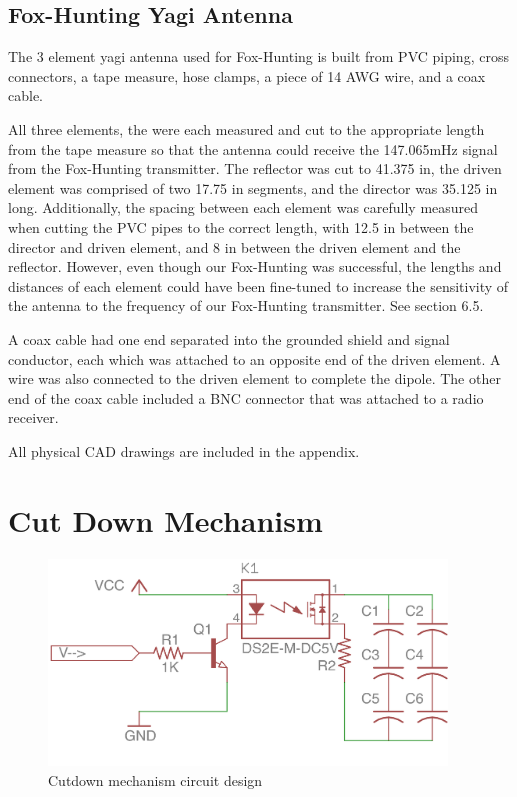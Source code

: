 \documentclass[12pt,]{article}
\begin{document}
\subsection{Fox-Hunting Yagi Antenna}\label{fox-hunting-yagi-antenna}

The 3 element yagi antenna used for Fox-Hunting is built from PVC
piping, cross connectors, a tape measure, hose clamps, a piece of 14 AWG
wire, and a coax cable.

All three elements, the were each measured and cut to the appropriate
length from the tape measure so that the antenna could receive the
147.065mHz signal from the Fox-Hunting transmitter. The reflector was
cut to 41.375 in, the driven element was comprised of two 17.75 in
segments, and the director was 35.125 in long. Additionally, the spacing
between each element was carefully measured when cutting the PVC pipes
to the correct length, with 12.5 in between the director and driven
element, and 8 in between the driven element and the reflector. However,
even though our Fox-Hunting was successful, the lengths and distances of
each element could have been fine-tuned to increase the sensitivity of
the antenna to the frequency of our Fox-Hunting transmitter. See section
6.5.

A coax cable had one end separated into the grounded shield and signal
conductor, each which was attached to an opposite end of the driven
element. A wire was also connected to the driven element to complete the
dipole. The other end of the coax cable included a BNC connector that
was attached to a radio receiver.

All physical CAD drawings are included in the appendix.

\section{Cut Down Mechanism}\label{cut-down-mechanism}

\begin{figure}

{\centering \includegraphics[width=400px]{assets/cutdown} 

}

\caption{\label{fig:figs} Cutdown mechanism circuit design}\label{fig:cutdown_diagram}
\end{figure}
\end{document}

